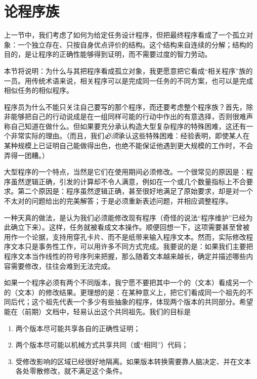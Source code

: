 \documentclass[twoside,11pt,fontset=none]{ctexbook}
\begin{document}
\section[论程序族]{论程序族}

上一节中，我们考虑了如何为给定任务设计程序，但把最终程序看成了一个孤立对象：一个独立存在、只按自身优点评价的结构。这个结构来自连续的分解；结构的目的，是让程序的正确性能够得到证明，而不需要过度的智力劳动。

本节将说明：为什么与其把程序看成孤立对象，我更愿意把它看成“相关程序”族的一员。用传统术语来说，相关程序可以是完成同一任务的不同方案，也可以是完成相似任务的相似程序。

程序员为什么不能只关注自己要写的那个程序，而还要考虑整个程序族？首先，除非能够把自己的行动说成是在一组同样可能的行动中作出的有意选择，否则很难声称自己知道在做什么。但如果要充分承认构造大型复杂程序的特殊困难，这还有一个非常实际的理由。（而且，我们\textit{必须}承认这些特殊困难：经验表明，即使某人在某种规模上已证明自己能做得出色，也绝不能保证他遇到更大规模的工作时，不会弄得一团糟。）

大型程序的一个特点，当然是它们在使用期间必须修改。一个很常见的原因是：程序虽然逻辑正确，引发的计算却不令人满意，例如在一个或几个数量指标上不合要求。第二个原因是：程序虽然逻辑正确，甚至很好地满足了原始要求，却是对一个不太对的问题给出的完美解答；于是必须重新表述问题，并相应调整程序。

一种天真的做法，是认为我们必须能修改现有程序（奇怪的说法“程序维护”已经为此确立下来）。这样，任务就被看成文本操作。顺便回想一下，这项需要甚至曾被用作一个论据，支持用穿孔卡片、而不是纸带来输入程序文本。然而，实际修改程序文本只是事务性工作，可以用许多不同方式完成。我要说的是：如果我们主要把程序文本当作线性的符号序列来把握，那么随着文本越来越长，确定并描述哪些内容需要修改，往往会难到无法完成。

如果一个程序必须有两个不同版本，我宁愿不要把其中一个的（文本）看成另一个的（文本）的修改结果。更理想的是：在某种意义上，把它们看成同一个祖先的不同后代；这个祖先代表一个多少有些抽象的程序，体现两个版本的共同部分。希望能在（前期）文档中，轻易认出这个共同祖先。我们的目标是

\begin{enumerate}[wide, nosep, label=(\arabic*)]
	\item 两个版本尽可能共享各自的正确性证明；

	\item 两个版本尽可能以机械方式共享共同（或“相同”）代码；

	\item 受修改影响的区域已经很好地隔离。如果版本转换需要靠人脑决定、并在文本各处零散修改，就不满足这个条件。
\end{enumerate}
\end{document}
